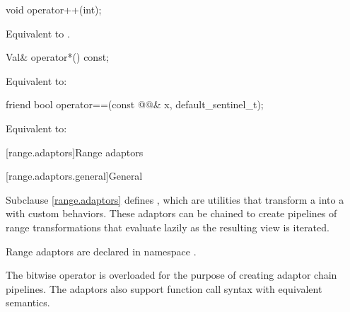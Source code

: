 %
\begin{itemdecl}
void operator++(int);
\end{itemdecl}

\begin{itemdescr}
\pnum
\effects
Equivalent to .
\end{itemdescr}

%
\begin{itemdecl}
Val& operator*() const;
\end{itemdecl}

\begin{itemdescr}
\pnum
\effects
Equivalent to: 
\end{itemdescr}

%
\begin{itemdecl}
friend bool operator==(const @@& x, default_sentinel_t);
\end{itemdecl}

\begin{itemdescr}
\pnum
\effects
Equivalent to: 
\end{itemdescr}

[range.adaptors]{Range adaptors}

[range.adaptors.general]{General}

\pnum
Subclause \ref{range.adaptors} defines , which are utilities that transform a
 into a  with custom behaviors. These
adaptors can be chained to create pipelines of range transformations that
evaluate lazily as the resulting view is iterated.

\pnum
Range adaptors are declared in namespace .

\pnum
The bitwise  operator is overloaded for the purpose of creating adaptor chain
pipelines. The adaptors also support function call syntax with equivalent
semantics.

\pnum
\begin{example}
\end{example}

